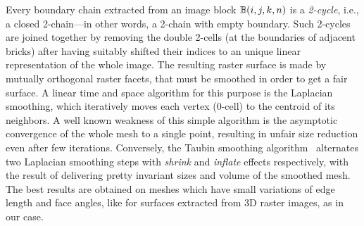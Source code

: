 Every boundary chain extracted from an image block $\mathbb{B}(i,j,k,n)$ is a \emph{2-cycle}, i.e., a closed 2-chain---in other words, a 2-chain with empty boundary. Such 2-cycles are joined together by removing the double 2-cells (at the boundaries of adjacent bricks) after having suitably shifted their indices to an unique linear representation of the whole image. The resulting raster surface is made by mutually orthogonal raster facets, that must be smoothed in order to get a fair surface. A linear time and space algorithm for this purpose is the Laplacian smoothing, which iteratively  moves each vertex (0-cell) to the centroid of its neighbors. A well known weakness of this simple algorithm is the asymptotic convergence of the whole mesh to a single point, resulting in unfair size reduction even after few iterations.  Conversely, the Taubin smoothing algorithm~\cite{Taubin:1995:SPA:218380.218473,egst.20001029} alternates two Laplacian smoothing steps with \emph{shrink} and \emph{inflate} effects respectively, with the result of delivering pretty invariant sizes and volume of the smoothed mesh. The best results are obtained on meshes which have small variations of edge length and face angles, like for surfaces extracted from 3D raster images, as in our case.
 

